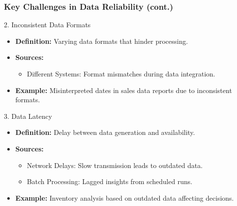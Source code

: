 \documentclass{beamer}
\begin{document}
\begin{frame}[fragile]
    \frametitle{Key Challenges in Data Reliability (cont.)}
    \begin{block}{2. Inconsistent Data Formats}
        \begin{itemize}
            \item \textbf{Definition:} Varying data formats that hinder processing.
            \item \textbf{Sources:}
                \begin{itemize}
                    \item Different Systems: Format mismatches during data integration.
                \end{itemize}
            \item \textbf{Example:} Misinterpreted dates in sales data reports due to inconsistent formats.
        \end{itemize}
    \end{block}

    \begin{block}{3. Data Latency}
        \begin{itemize}
            \item \textbf{Definition:} Delay between data generation and availability.
            \item \textbf{Sources:}
                \begin{itemize}
                    \item Network Delays: Slow transmission leads to outdated data.
                    \item Batch Processing: Lagged insights from scheduled runs.
                \end{itemize}
            \item \textbf{Example:} Inventory analysis based on outdated data affecting decisions.
        \end{itemize}
    \end{block}
\end{frame}
\end{document}
